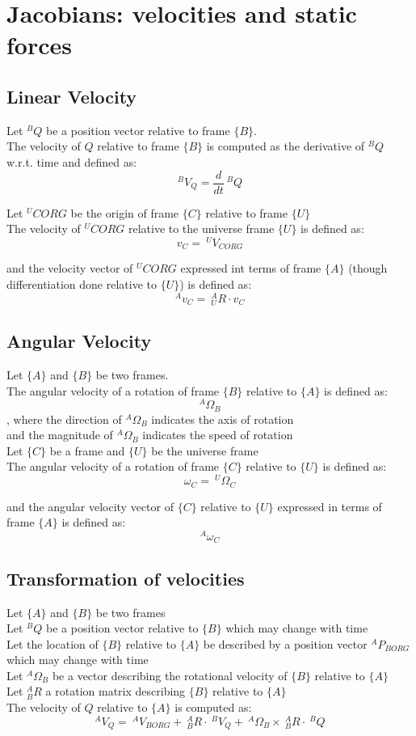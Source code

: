 \documentclass[10pt,a4paper]{article}
\begin{document}
\section{Jacobians: velocities and static forces}
\subsection{Linear Velocity}
Let $^BQ$ be a position vector relative to frame $\{B\}$. \\
The velocity of $Q$ relative to frame $\{B\}$ is computed as the derivative of $^BQ$ w.r.t. time and defined as:
$$
^BV_Q = \frac{d}{dt} ~^BQ
$$

Let $^UCORG$ be the origin of frame $\{C\}$ relative to frame $\{U\}$ \\
The velocity of $^UCORG$ relative to the universe frame $\{U\}$ is defined as:
$$
v_C = ~^UV_{CORG}
$$

and the velocity vector of $^UCORG$ expressed int terms of frame $\{A\}$ (though differentiation done relative to $\{U\}$) is defined as:
$$
^Av_C = ~^A_UR ⋅ v_C
$$

\subsection{Angular Velocity}
Let $\{A\}$ and $\{B\}$ be two frames. \\
The angular velocity of a rotation of frame $\{B\}$ relative to $\{A\}$ is defined as:
$$
^A\Omega_B
$$
, where the direction of $^A\Omega_B$ indicates the axis of rotation \\
and the magnitude of $^A\Omega_B$ indicates the speed of rotation \\

Let $\{C\}$ be a frame and $\{U\}$ be the universe frame \\
The angular velocity of a rotation of frame $\{C\}$ relative to $\{U\}$ is defined as:
$$
\omega_C = ~^U\Omega_{C}
$$

and the angular velocity vector of $\{C\}$ relative to $\{U\}$ expressed in terms of frame $\{A\}$ is defined as:
$$
^A\omega_C
$$

\subsection{Transformation of velocities}
Let $\{A\}$ and $\{B\}$ be two frames \\
Let $^BQ$ be a position vector relative to $\{B\}$ which may change with time \\
Let the location of $\{B\}$ relative to $\{A\}$ be described by a position vector $^AP_{BORG}$ which may change with time \\
Let $^A\Omega_B$ be a vector describing the rotational velocity of $\{B\}$ relative to $\{A\}$ \\
Let $^A_BR$ a rotation matrix describing $\{B\}$ relative to $\{A\}$ \\
The velocity of $Q$ relative to $\{A\}$ is computed as: \\
$$
^AV_Q = ~^AV_{BORG} + ~^A_BR ⋅~^BV_Q + ~^A\Omega_B \times ~^A_BR ⋅ ~^BQ
$$
\end{document}
